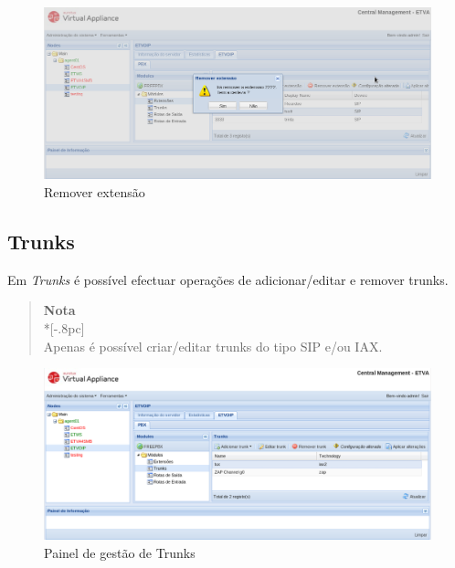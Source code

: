 \begin{figure}[H]
        \begin{center}
        \includegraphics[scale=0.4]{screenshots/etvoip_pbx_extensions_remove.png}
        \caption{Remover extensão}
        \label{fig:etvoip_pbx_extensions_remove}
        \end{center}
\end{figure}

\subsection{Trunks}

Em \emph{Trunks} é possível efectuar operações de adicionar/editar e remover trunks.

\begin{quote}
	{\large \bf Nota} \\*[-.8pc]
	\underline{\hspace{6in}} \\
    Apenas é possível criar/editar trunks do tipo SIP e/ou IAX.
\end{quote}

\begin{figure}[H]
        \begin{center}
        \includegraphics[scale=0.4]{screenshots/etvoip_pbx_trunks.png}
        \caption{Painel de gestão de Trunks}
        \label{fig:etvoip_pbx_trunks}
        \end{center}
\end{figure}

